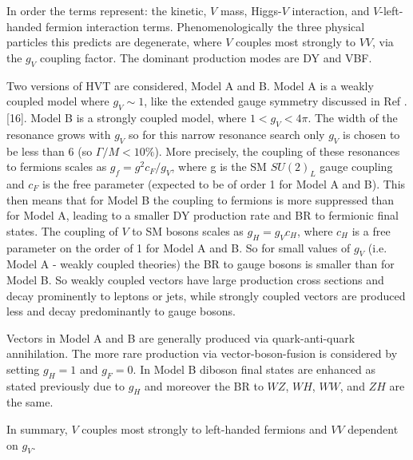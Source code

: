 In order the terms represent: the kinetic, $V$ mass, Higgs-$V$ interaction, and $V$-left-handed fermion interaction terms. Phenomenologically the three physical particles this predicts are degenerate, where $V$ couples most strongly to $VV$, via the $g_{V}$ coupling factor. The dominant production modes are DY and VBF. 

Two versions of HVT are considered, Model A and B. Model A is  a weakly coupled model where $g_{V} \sim 1$, like the extended gauge symmetry discussed in Ref . [16]. Model B is a strongly coupled model, where $1<g_{V}<4\pi$. The width of the resonance grows with $g_{V}$ so for this narrow resonance search only $g_{V}$ is chosen to be less than 6 (so $\Gamma / M < 10\%$). More precisely, the coupling of these resonances to fermions scales as $g_{f} = g^{2}c_{F}/g_{V}$, where g is the SM $SU(2)_{L}$ gauge coupling and $c_{F}$ is the free parameter (expected to be of order 1 for Model A and B). This then means that for Model B the coupling to fermions is more suppressed than for Model A, leading to a smaller DY production rate and BR to fermionic final states. The coupling of $V$ to SM bosons scales as $g_{H}=g_{V}c_{H}$, where $c_{H}$ is a free parameter on the order of 1 for Model A and B. So for small values of $g_{V}$ (i.e. Model A - weakly coupled theories) the BR to gauge bosons is smaller than for Model B. So weakly coupled vectors have large production cross sections and decay prominently to leptons or jets, while strongly coupled vectors are produced less and decay predominantly to gauge bosons. 

Vectors in Model A and B are generally produced via quark-anti-quark annihilation. The more rare production via vector-boson-fusion is considered by setting $g_{H} = 1$ and $g_{F}=0$. In Model B diboson final states are enhanced as stated previously due to $g_{H}$ and moreover the BR to $WZ$, $WH$, $WW$, and $ZH$ are the same.

In summary, $V$ couples most strongly to left-handed fermions and $VV$ dependent on $g_{V}$. 
